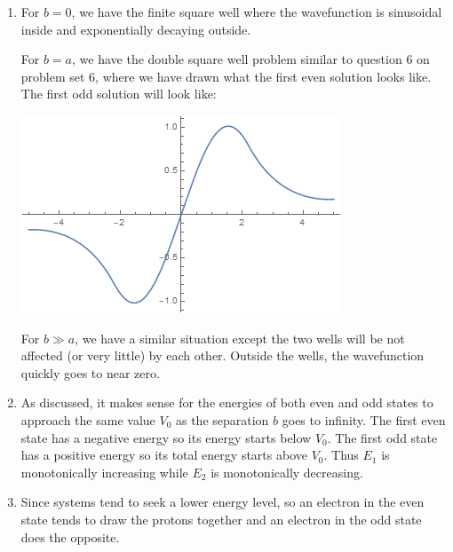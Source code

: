\begin{sol}
\begin{enumerate}[label=\textbf{(\alph*)}]
    \item For $b=0$, we have the finite square well where the wavefunction is sinusoidal inside and exponentially decaying outside.
    \vspace{2mm}
    
    For $b=a$, we have the double square well problem similar to question 6 on problem set 6, where we have drawn what the first even solution looks like. The first odd solution will look like:
    \begin{center}
        \includegraphics[width=0.5\linewidth]{Images/7-2a.png}
    \end{center}
    \vspace{2mm}
    
    For $b \gg a$, we have a similar situation except the two wells will be not affected (or very little) by each other. Outside the wells, the wavefunction quickly goes to near zero.
    
    \item As discussed, it makes sense for the energies of both even and odd states to approach the same value $V_0$ as the separation $b$ goes to infinity. The first even state has a negative energy so its energy starts below $V_0$. The first odd state has a positive energy so its total energy starts above $V_0$. Thus $E_1$ is monotonically increasing while $E_2$ is monotonically decreasing.
    
    \item Since systems tend to seek a lower energy level, so an electron in the even state tends to draw the protons together and an electron in the odd state does the opposite.
\end{enumerate}
\end{sol}